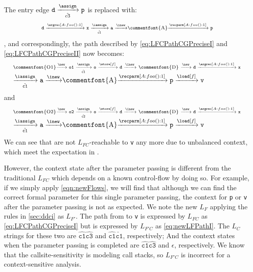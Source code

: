 The entry edge $\texttt{d}
    \xrightarrow[\hat{c3}]{\assign} \texttt{p}$ is replaced with:
\begin{equation}
  \centering
\label{eq:ParmPath}
\begin{tabular}{l} \scriptsize
$\texttt{d}\xrightarrow{\argrec[A:foo():1]}\texttt{x}
\xrightarrow[\check{\mathtt{c1}}]{\iassign}\texttt{a}
\xrightarrow{\inew}$\commentfont{A}$\xrightarrow{\recparm[A:foo():1]}\texttt{p}$
\end{tabular}
\end{equation},
and correspondingly, the path described by \cref{eq:LFCPathCGPreciseI} and \cref{eq:LFCPathCGPreciseII} now becomes:
\begin{equation}
  \centering
\label{eq:newLFPathI}
\begin{tabular}{l} \scriptsize
\commentfont{O1}$\xrightarrow{\new}
\texttt{o1}\xrightarrow[\hat{\mathtt{c1}}]{\assign}
\texttt{o} \xrightarrow{\store[f]} \texttt{d}
\xrightarrow{\inew}$ \commentfont{D} 
$ \xrightarrow{\new} \texttt{d}\xrightarrow{\argrec[A:foo():1]}\texttt{x}$\\
$\xrightarrow[\check{\mathtt{c1}}]{\iassign}\texttt{a}
\xrightarrow{\inew}$\commentfont{A}$\xrightarrow{\recparm[A:foo():1]}\texttt{p}
    \xrightarrow{\load[f]} \texttt{v}
$
\end{tabular}
\end{equation}
and
\begin{equation}
  \centering
\label{eq:newLFPathII}
\begin{tabular}{l} \scriptsize
\commentfont{O2}$\xrightarrow{\new}
\texttt{o2}\xrightarrow[\hat{\mathtt{c2}}]{\assign}
\texttt{o} \xrightarrow{\store[f]} \texttt{d}
\xrightarrow{\inew}$ \commentfont{D} 
$ \xrightarrow{\new} \texttt{d}\xrightarrow{\argrec[A:foo():1]}\texttt{x}$\\
$\xrightarrow[\check{\mathtt{c1}}]{\iassign}\texttt{a}
\xrightarrow{\inew}$\commentfont{A}$\xrightarrow{\recparm[A:foo():1]}\texttt{p}
    \xrightarrow{\load[f]} \texttt{v}
$
\end{tabular}
\end{equation}
We can see that  are not $L_{FC}$-reachable to \texttt{v} any more due to unbalanced context, which meet the expectation in .

However, the context state after the parameter passing is different from the traditional $L_{FC}$ which depends on a known control-flow by doing so. For example, if we simply apply \cref{eqn:newFlows}, we will find that although we can find the correct formal parameter for this single parameter passing, the context for \texttt{p} or \texttt{v} after the parameter passing is not as expected. We note the new $L_F$ applying the rules in \cref{sec:ddci} as $L_{F'}$. The path from  to 
\texttt{v} is expressed by $L_{FC}$ as \cref{eq:LFCPathCGPreciseI} but is expressed by $L_{F'C}$ as \cref{eq:newLFPathI}.
The $L_C$ strings for these two are $\hat{\mathtt{c1}}\hat{\mathtt{c3}}$ and $\hat{\mathtt{c1}}\check{\mathtt{c1}}$, respectively; And the context states when the parameter passing is completed are $\hat{\mathtt{c1}}\hat{\mathtt{c3}}$ and $\epsilon$, respectively.
We know that the callsite-sensitivity is modeling call stacks, so $L_{F'C}$ is incorrect for a context-sensitive analysis.

